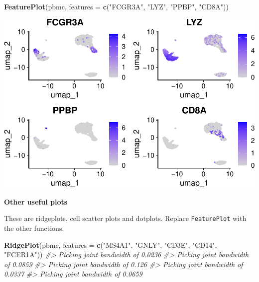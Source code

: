 \documentclass[
]{book}
\newenvironment{Shaded}{\begin{snugshade}}{\end{snugshade}}
\newcommand{\AttributeTok}[1]{\textcolor[rgb]{0.13,0.29,0.53}{#1}}
\newcommand{\CommentTok}[1]{\textcolor[rgb]{0.56,0.35,0.01}{\textit{#1}}}
\newcommand{\FunctionTok}[1]{\textcolor[rgb]{0.13,0.29,0.53}{\textbf{#1}}}
\newcommand{\NormalTok}[1]{#1}
\newcommand{\StringTok}[1]{\textcolor[rgb]{0.31,0.60,0.02}{#1}}
\begin{document}
\begin{Shaded}
\begin{Highlighting}[]
\FunctionTok{FeaturePlot}\NormalTok{(pbmc, }\AttributeTok{features =} \FunctionTok{c}\NormalTok{(}\StringTok{"FCGR3A"}\NormalTok{, }\StringTok{"LYZ"}\NormalTok{, }\StringTok{"PPBP"}\NormalTok{, }\StringTok{"CD8A"}\NormalTok{))}
\end{Highlighting}
\end{Shaded}

\includegraphics{scRNAseqInR_Doco_files/figure-latex/markerplots-2.pdf}

\textbf{Other useful plots}

These are ridgeplots, cell scatter plots and dotplots. Replace \texttt{FeaturePlot} with the other functions.

\begin{Shaded}
\begin{Highlighting}[]
\FunctionTok{RidgePlot}\NormalTok{(pbmc, }\AttributeTok{features =} \FunctionTok{c}\NormalTok{(}\StringTok{"MS4A1"}\NormalTok{, }\StringTok{"GNLY"}\NormalTok{, }\StringTok{"CD3E"}\NormalTok{, }\StringTok{"CD14"}\NormalTok{, }\StringTok{"FCER1A"}\NormalTok{))}
\CommentTok{\#\textgreater{} Picking joint bandwidth of 0.0236}
\CommentTok{\#\textgreater{} Picking joint bandwidth of 0.0859}
\CommentTok{\#\textgreater{} Picking joint bandwidth of 0.126}
\CommentTok{\#\textgreater{} Picking joint bandwidth of 0.0337}
\CommentTok{\#\textgreater{} Picking joint bandwidth of 0.0659}
\end{Highlighting}
\end{Shaded}
\end{document}
